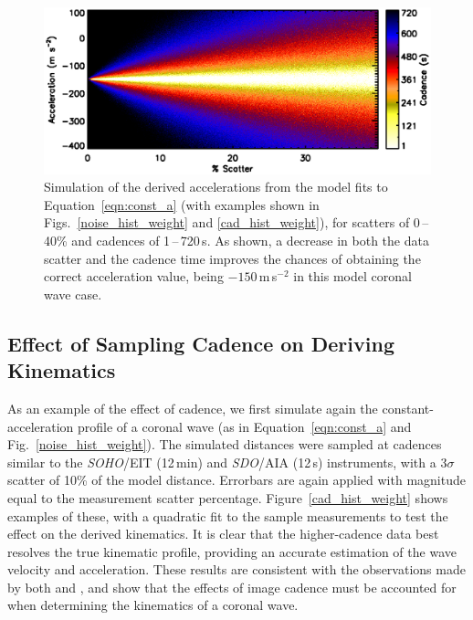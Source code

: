 \documentclass[referee]{aa}
\begin{document}
\begin{figure}[!b]
\begin{center}
\includegraphics[scale=0.53, trim=20 10 0 20]{images/fig_noise_cad.eps}
\caption{Simulation of the derived accelerations from the model fits to Equation~\ref{eqn:const_a} (with examples shown in Figs.~\ref{noise_hist_weight} and \ref{cad_hist_weight}), for scatters of 0\,--\,40\% and cadences of 1\,--\,720\,s. As shown, a decrease in both the data scatter and the cadence time improves the chances of obtaining the correct acceleration value, being $-150$\,m\,s$^{-2}$ in this model coronal wave case.}
\label{noise_test_image}
\end{center}
\end{figure}


\subsection{Effect of Sampling Cadence on Deriving Kinematics}
\label{subsect:cadence}

As an example of the effect of cadence, we first simulate again the constant-acceleration profile of a coronal wave (as in Equation~\ref{eqn:const_a} and Fig.~\ref{noise_hist_weight}). The simulated distances were sampled at cadences similar to the \emph{SOHO}/EIT (12\,min) and \emph{SDO}/AIA (12\,s) instruments, with a $3\sigma$ scatter of 10\% of the model distance. Errorbars are again applied with magnitude equal to the measurement scatter percentage. Figure~\ref{cad_hist_weight} shows examples of these, with a quadratic fit to the sample measurements to test the effect on the derived kinematics. It is clear that the higher-cadence data best resolves the true kinematic profile, providing an accurate estimation of the wave velocity and acceleration. These results are consistent with the observations made by both \citet{2008ApJ...680L..81L} and \citet{2009ApJ...707..503M}, and show that the effects of image cadence must be accounted for when determining the kinematics of a coronal wave.
\end{document}
